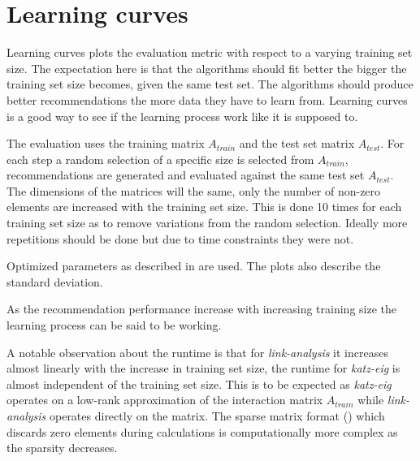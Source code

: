 
\section{Learning curves}\label{sec:graphs:learning_curves}

Learning curves plots the evaluation metric with respect to a varying training set size. The expectation here is that the algorithms should fit better the bigger the training set size becomes, given the same test set. The algorithms should produce better recommendations the more data they have to learn from. Learning curves is a good way to see if the learning process work like it is supposed to.

The evaluation uses the training matrix $A_{train}$ and the test set matrix $A_{test}$. For each step a random selection of a specific size is selected from $A_{train}$, recommendations are generated and evaluated against the same test set $A_{test}$. The dimensions of the matrices will the same, only the number of non-zero elements are increased with the training set size. This is done 10 times for each training set size as to remove variations from the random selection. Ideally more repetitions should be done but due to time constraints they were not.

Optimized parameters as described in  are used. The plots also describe the standard deviation.

\FloatBarrier

As the recommendation performance increase with increasing training size the learning process can be said to be working.

A notable observation about the runtime is that for \textit{link-analysis} it increases almost linearly with the increase in training set size, the runtime for \textit{katz-eig} is almost independent of the training set size. This is to be expected as \textit{katz-eig} operates on a low-rank approximation of the interaction matrix $A_{train}$ while \textit{link-analysis} operates directly on the matrix. The sparse matrix format () which discards zero elements during calculations is computationally more complex as the sparsity decreases.


